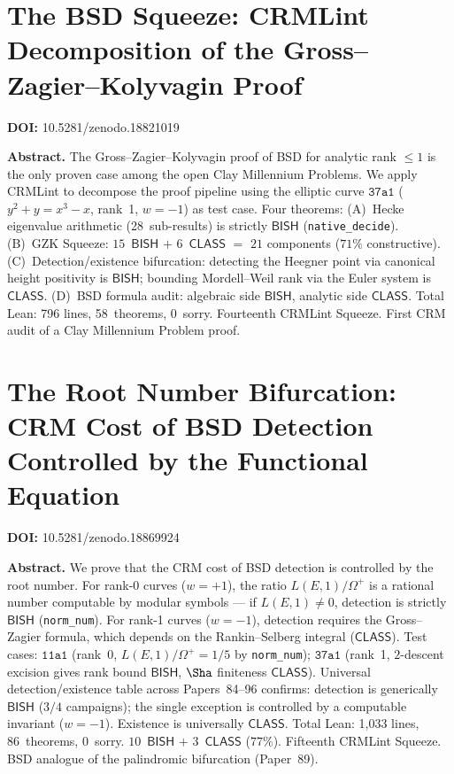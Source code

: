 \documentclass[11pt,a4paper]{article}
\begin{document}
\section{The BSD Squeeze: CRMLint Decomposition of the Gross--Zagier--Kolyvagin Proof}
\label{sec:p95}
\textbf{DOI:} 10.5281/zenodo.18821019

\bigskip
\noindent\textbf{Abstract.}
The Gross--Zagier--Kolyvagin proof of BSD for analytic rank $\leq 1$ is the only proven case among the open Clay Millennium Problems. We apply CRMLint to decompose the proof pipeline using the elliptic curve $\texttt{37a1}$ ($y^2 + y = x^3 - x$, rank~1, $w = -1$) as test case. Four theorems: (A)~Hecke eigenvalue arithmetic (28~sub-results) is strictly $\mathsf{BISH}$ (\texttt{native\_decide}). (B)~GZK Squeeze: $15$~$\mathsf{BISH}$ $+$ $6$~$\mathsf{CLASS}$ $=$ $21$ components ($71\%$ constructive). (C)~Detection/existence bifurcation: detecting the Heegner point via canonical height positivity is $\mathsf{BISH}$; bounding Mordell--Weil rank via the Euler system is $\mathsf{CLASS}$. (D)~BSD formula audit: algebraic side $\mathsf{BISH}$, analytic side $\mathsf{CLASS}$. Total Lean: 796 lines, 58~theorems, 0~sorry. Fourteenth CRMLint Squeeze. First CRM audit of a Clay Millennium Problem proof.

\section{The Root Number Bifurcation: CRM Cost of BSD Detection Controlled by the Functional Equation}
\label{sec:p96}
\textbf{DOI:} 10.5281/zenodo.18869924

\bigskip
\noindent\textbf{Abstract.}
We prove that the CRM cost of BSD detection is controlled by the root number. For rank-0 curves ($w = +1$), the ratio $L(E,1)/\Omega^+$ is a rational number computable by modular symbols --- if $L(E,1) \neq 0$, detection is strictly $\mathsf{BISH}$ (\texttt{norm\_num}). For rank-1 curves ($w = -1$), detection requires the Gross--Zagier formula, which depends on the Rankin--Selberg integral ($\mathsf{CLASS}$). Test cases: $\texttt{11a1}$ (rank~0, $L(E,1)/\Omega^+ = 1/5$ by \texttt{norm\_num}); $\texttt{37a1}$ (rank~1, $2$-descent excision gives rank bound $\mathsf{BISH}$, $\Sha$ finiteness $\mathsf{CLASS}$). Universal detection/existence table across Papers~84--96 confirms: detection is generically $\mathsf{BISH}$ ($3/4$ campaigns); the single exception is controlled by a computable invariant ($w = -1$). Existence is universally $\mathsf{CLASS}$. Total Lean: 1,033 lines, 86~theorems, 0~sorry. $10$~$\mathsf{BISH}$ $+$ $3$~$\mathsf{CLASS}$ ($77\%$). Fifteenth CRMLint Squeeze. BSD analogue of the palindromic bifurcation (Paper~89).
\end{document}
